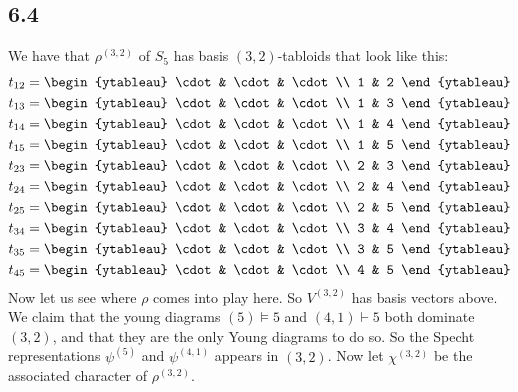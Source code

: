 \documentclass[]{article}
\begin{document}
\subsection*{6.4}
We have that $\rho^{(3,2)}$ of $S_5$ has basis $(3,2)$-tabloids that look like this:
\begin{align*}
	t_{12} &= 
	\begin{ytableau}
		\cdot & \cdot & \cdot\\
		1 & 2
	\end{ytableau}\\
		t_{13} &= 
	\begin{ytableau}
		\cdot & \cdot & \cdot\\
		1 & 3
	\end{ytableau}\\
		t_{14} &= 
	\begin{ytableau}
		\cdot & \cdot & \cdot\\
		1 & 4
	\end{ytableau}\\
		t_{15} &= 
	\begin{ytableau}
		\cdot & \cdot & \cdot\\
		1 & 5
	\end{ytableau}\\
		t_{23} &= 
	\begin{ytableau}
		\cdot & \cdot & \cdot\\
		2 & 3
	\end{ytableau}\\
			t_{24} &= 
	\begin{ytableau}
		\cdot & \cdot & \cdot\\
		2 & 4
	\end{ytableau}\\
			t_{25} &= 
	\begin{ytableau}
		\cdot & \cdot & \cdot\\
		2 & 5
	\end{ytableau}\\
			t_{34} &= 
	\begin{ytableau}
		\cdot & \cdot & \cdot\\
		3 & 4
	\end{ytableau}\\
	t_{35} &= 
	\begin{ytableau}
		\cdot & \cdot & \cdot\\
		3 & 5
	\end{ytableau}\\
	t_{45} &= 
	\begin{ytableau}
		\cdot & \cdot & \cdot\\
		4 & 5
	\end{ytableau}\\
\end{align*}
Now let us see where $\rho$ comes into play here. So $V^{(3,2)}$ has basis vectors above. We claim that the young diagrams $(5) \vDash 5$ and $(4,1) \vdash 5$ both dominate $(3,2)$, and that they are the only Young diagrams to do so. So the Specht representations $\psi^{(5)}$ and $\psi^{(4,1)}$ appears in $(3,2)$. Now let $\chi^{(3,2)}$ be the associated character of $\rho^{(3,2)}$. 
\end{document}
